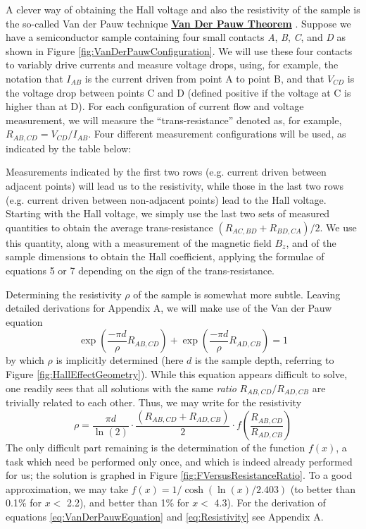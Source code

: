 \documentclass{../lab}
\begin{document}
A clever way of obtaining the Hall voltage and also the resistivity of the sample is the so-called Van der Pauw technique \href{http://experimentationlab.berkeley.edu/node/105}{\textbf{Van Der Pauw Theorem}} . Suppose we have a semiconductor sample containing four small contacts \emph{A}, \emph{B}, \emph{C}, and \emph{D} as shown in Figure \ref{fig:VanDerPauwConfiguration}. We will use these four contacts to variably drive currents and measure voltage drops, using, for example, the notation that $I_{AB}$ is the current driven from point A to point B, and that $V_{CD}$ is the voltage drop between points C and D (defined positive if the voltage at C is higher than at D). For each configuration of current flow and voltage measurement, we will measure the ``trans-resistance'' denoted as, for example, $R_{AB,CD} = V_{CD} / I_{AB}$. Four different measurement configurations will be used, as indicated by the table below:

Measurements indicated by the first two rows (e.g. current driven between adjacent points) will lead us to the resistivity, while those in the last two rows (e.g. current driven between non-adjacent points) lead to the Hall voltage. Starting with the Hall voltage, we simply use the last two sets of measured quantities to obtain the average trans-resistance $(R_{AC,BD} + R_{BD,CA})/2$. We use this quantity, along with a measurement of the magnetic field $B_z$, and of the sample dimensions to obtain the Hall coefficient, applying the formulae of equations 5 or 7 depending on the sign of the trans-resistance.

Determining the resistivity $\rho$ of the sample is somewhat more subtle. Leaving detailed derivations for Appendix A, we will make use of the Van der Pauw equation
\begin{equation}
\label{eq:VanDerPauwEquation}
    \exp \left(\frac{-\pi d}{\rho} R_{AB,CD} \right) + \exp \left(\frac{-\pi d}{\rho} R_{AD,CB} \right) = 1
\end{equation}
by which $\rho$ is implicitly determined (here $d$ is the sample depth, referring to Figure \ref{fig:HallEffectGeometry}). While this equation appears difficult to solve, one readily sees that all solutions with the same \emph{ratio} $R_{AB,CD} / R_{AD,CB}$ are trivially related to each other. Thus, we may write for the resistivity
\begin{equation}
\label{eq:Resistivity}
    \rho = \frac{\pi d}{\ln(2)} \cdot \frac{(R_{AB,CD}+R_{AD,CB})}{2} \cdot f \left( \frac{R_{AB,CD}}{R_{AD,CB}} \right)
\end{equation}
The only difficult part remaining is the determination of the function $f(x)$, a task which need be performed only once, and which is indeed already performed for us; the solution is graphed in Figure \ref{fig:FVersusResistanceRatio}. To a good approximation, we may take $f(x) = 1/\cosh(\ln(x)/2.403)$ (to better than 0.1\% for $x <$ 2.2), and better than 1\% for $x <$ 4.3). For the derivation of equations \eqref{eq:VanDerPauwEquation} and \eqref{eq:Resistivity} see Appendix A.
\end{document}
